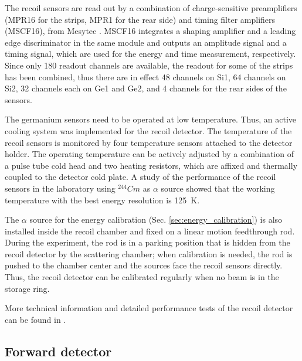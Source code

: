 \documentclass[number,5p]{elsarticle}
\begin{document}
The recoil sensors are read out by a combination of charge-sensitive preamplifiers (MPR16 for the strips, MPR1 for the rear side) and timing filter amplifiers (MSCF16), from Mesytec \cite{mesytec}. 
MSCF16 integrates a shaping amplifier and a leading edge discriminator in the
same module and outputs an amplitude signal and a timing signal, which are used
for the energy and time measurement, respectively.
Since only 180 readout channels are available, the readout for some of the
strips has been combined, thus there are in effect 48 channels on Si1, 64
channels on Si2, 32 channels each on Ge1 and Ge2, and 4 channels for the rear sides
of the sensors. 

The germanium sensors need to be operated at low temperature.
Thus, an active cooling system was implemented for the recoil detector.
The temperature of the recoil sensors is monitored by four temperature sensors attached to the detector holder.
The operating temperature can be actively adjusted by a combination of a pulse
tube cold head \cite{pt30} and two heating resistors, which are affixed and thermally coupled to the detector cold plate.
A study of the performance of the recoil sensors in the laboratory using
$^{244}Cm$ as $\alpha$ source \cite{recoil_article} showed that the working temperature with the best energy resolution is
\SI{125}{\kelvin}.

The $\alpha$ source for the energy calibration (Sec. \ref{sec:energy_calibration}) is also installed inside the recoil chamber and fixed on a linear motion feedthrough rod.
During the experiment, the rod is in a parking position that is hidden from the
recoil detector by the scattering chamber;
when calibration is needed, the rod is pushed to the chamber center and the sources face the recoil sensors directly.
Thus, the recoil detector can be calibrated regularly when no beam is in the storage ring.

More technical information and detailed performance tests of the recoil detector can be found in \cite{recoil_article}.

\subsection{Forward detector}
\label{sec:fwd}
\end{document}
